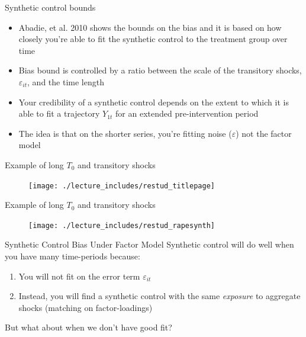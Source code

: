 \documentclass{beamer}
\begin{document}
\begin{frame}{Synthetic control bounds}

\begin{itemize}
  \item Abadie, et al. 2010 shows the bounds on the bias and it is based on how closely you're able to fit the synthetic control to the treatment group over time
  \item Bias bound is controlled by a ratio between the scale of the transitory shocks, $\varepsilon_{it}$, and the time length
  \item Your credibility of a synthetic control depends on the extent to which it is able to fit a trajectory  $Y_{1t}$ for an extended pre-intervention period
  \item The idea is that on the shorter series, you're fitting noise ($\varepsilon$) not the factor model
 \end{itemize}
 
 \end{frame}



\begin{frame}{Example of long $T_0$ and transitory shocks}

	\begin{figure}
	\texttt{[image: ./lecture\_includes/restud\_titlepage]}
	\end{figure}

\end{frame}

\begin{frame}{Example of long $T_0$ and transitory shocks}

	\begin{figure}
	\texttt{[image: ./lecture\_includes/restud\_rapesynth]}
	\end{figure}

\end{frame}




\begin{frame}{ Synthetic Control Bias Under Factor Model}
  Synthetic control will do well when you have many time-periods because:
  \begin{enumerate}
    \item You will not fit on the error term $\varepsilon_{it}$ 
    \item Instead, you will find a synthetic control with the same \emph{exposure} to aggregate shocks (matching on factor-loadings)
  \end{enumerate}

  \bigskip
  But what about when we don't have good fit?
\end{frame}
\end{document}
